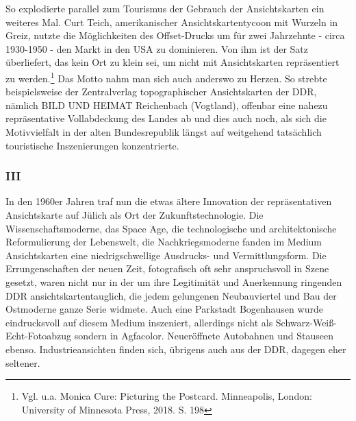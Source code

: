 \documentclass[a4paper,
fontsize=11pt,
oneside,
numbers=noperiodatend,
parskip=half-,
bibliography=totoc,
final
]{scrartcl}
\begin{document}
So explodierte parallel zum Tourismus der Gebrauch der Ansichtskarten
ein weiteres Mal. Curt Teich, amerikanischer Ansichtskartentycoon mit
Wurzeln in Greiz, nutzte die Möglichkeiten des Offset-Drucks um für zwei
Jahrzehnte - circa 1930-1950 - den Markt in den USA zu dominieren. Von
ihm ist der Satz überliefert, das kein Ort zu klein sei, um nicht mit
Ansichtskarten repräsentiert zu werden.\footnote{Vgl. u.a. Monica Cure:
  Picturing the Postcard. Minneapolis, London: University of Minnesota
  Press, 2018. S. 198} Das Motto nahm man sich auch anderswo zu Herzen.
So strebte beispielsweise der Zentralverlag topographischer
Ansichtskarten der DDR, nämlich BILD UND HEIMAT Reichenbach (Vogtland),
offenbar eine nahezu repräsentative Vollabdeckung des Landes ab und dies
auch noch, als sich die Motivvielfalt in der alten Bundesrepublik längst
auf weitgehend tatsächlich touristische Inszenierungen konzentrierte.

\hypertarget{iii}{%
\subsubsection{III}\label{iii}}

In den 1960er Jahren traf nun die etwas ältere Innovation der
repräsentativen Ansichtskarte auf Jülich als Ort der
Zukunftstechnologie. Die Wissenschaftsmoderne, das Space Age, die
technologische und architektonische Reformulierung der Lebenswelt, die
Nachkriegsmoderne fanden im Medium Ansichtskarten eine niedrigschwellige
Ausdrucks- und Vermittlungsform. Die Errungenschaften der neuen Zeit,
fotografisch oft sehr anspruchsvoll in Szene gesetzt, waren nicht nur in
der um ihre Legitimität und Anerkennung ringenden DDR
ansichtskartentauglich, die jedem gelungenen Neubauviertel und Bau der
Ostmoderne ganze Serie widmete. Auch eine Parkstadt Bogenhausen wurde
eindrucksvoll auf diesem Medium inszeniert, allerdings nicht als
Schwarz-Weiß-Echt-Fotoabzug sondern in Agfacolor. Neueröffnete
Autobahnen und Stauseen ebenso. Industrieansichten finden sich, übrigens
auch aus der DDR, dagegen eher seltener.
\end{document}
